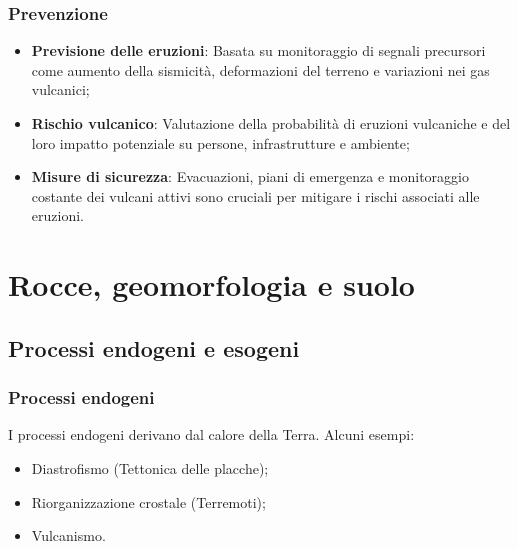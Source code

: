\documentclass{article}
\begin{document}
\subsubsection{Prevenzione}
\begin{itemize}
    \item \textbf{Previsione delle eruzioni}: Basata su monitoraggio di segnali precursori come
        aumento della sismicità, deformazioni del terreno e variazioni nei gas vulcanici;
    \item \textbf{Rischio vulcanico}: Valutazione della probabilità di eruzioni vulcaniche e del
        loro impatto potenziale su persone, infrastrutture e ambiente;
    \item \textbf{Misure di sicurezza}: Evacuazioni, piani di emergenza e monitoraggio costante
        dei vulcani attivi sono cruciali per mitigare i rischi associati alle eruzioni.
\end{itemize}

\newpage
\section{Rocce, geomorfologia e suolo}

\subsection{Processi endogeni e esogeni}

\subsubsection{Processi endogeni}
I processi endogeni derivano dal calore della Terra. Alcuni esempi:
\begin{itemize}
    \item Diastrofismo (Tettonica delle placche);
    \item Riorganizzazione crostale (Terremoti);
    \item Vulcanismo.
\end{itemize}
\end{document}
